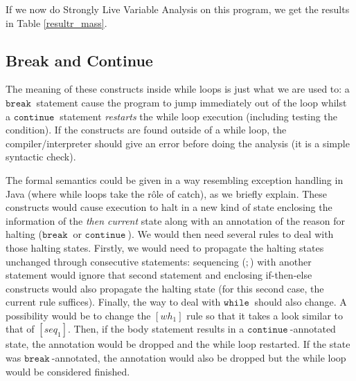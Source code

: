 \documentclass[a4wide,12pt]{article}
\def\while{\texttt{while}\ }
\def\cont {\texttt{continue}\ }
\def\breakc{\texttt{break}\ }
\def\restabR#1#2[#3]{\begin{table}\label{#3}\begin{center}\caption{#1}\begin{sideways}\end{sideways}\end{center}\end{table}}
\begin{document}
If we now do Strongly Live Variable Analysis on this program, we get the results in Table \ref{resultr_mass}.

\restabR{Strongly Live Variable Analysis with $\iota = r$ and multiple assignments}{resultr_mass.tex}[resultr_mass]
 
\subsection{Break and Continue}
The meaning of these constructs inside while loops is just what we are used to:
a $\breakc$ statement cause the program to jump immediately out of the loop whilst
a $\cont$ statement \emph{restarts} the while loop execution (including testing the condition).
If the constructs are found outside of a while loop, the compiler/interpreter should give an error before doing the analysis (it is a simple syntactic check).
 
The formal semantics could be given in a way resembling exception handling in Java (where while loops take
the r\^{o}le of catch), as we briefly explain. These constructs
would cause execution to halt in a new kind of state
enclosing the information of the \emph{then current} state along with an annotation of the reason
for halting ($\breakc$ or $\cont$).
We would then need several rules to deal with those halting states.
Firstly, we would need to propagate the halting states unchanged through consecutive statements:
sequencing ($;$) with another statement would ignore that second statement and enclosing
if-then-else constructs would also propagate the halting state (for this second case, the current
rule suffices). Finally, the way to deal with $\while$ should also change. A possibility
would be to change the $[wh_1]$ rule so that it takes a look similar to that of $[seq_1]$.
Then, if the body statement results in a $\cont$-annotated state, the annotation would be dropped
and the while loop restarted. If the state was $\breakc$-annotated, the annotation would also be
dropped but the while loop would be considered finished.
 
\end{document}

